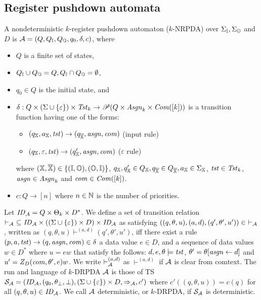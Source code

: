 \subsection{Register pushdown automata}\label{sec:RA}
\begin{definition}
A nondeterministic $k$-register pushdown automaton ($k$-NRPDA) over $\Sigma_{\mathbb{I}},\Sigma_{\mathbb{O}}$ and $D$ is ${\cal A}=(Q, Q_{\mathbb{I}}, Q_{\mathbb{O}}, q_0, \delta, c)$, where
\begin{itemize}
\item $Q$ is a finite set of states,
\item $Q_{\mathbb{I}}\cup Q_{\mathbb{O}} = Q, Q_{\mathbb{I}}\cap Q_{\mathbb{O}} = \emptyset$,
\item $q_0\in Q$ is the initial state, and
\item $\delta: Q \times (\Sigma\cup\{\varepsilon\})\times \mathit{Tst}_k \to \mathscr{P}(Q \times\mathit{Asgn}_k\times \mathit{Com}([k]))$ is a transition function having one of the forms:
\begin{itemize}
\item $(q_{\mathbb{X}},a_{\mathbb{X}},\mathit{tst})\to(q_{\overline{{\mathbb{X}}}},\mathit{asgn},\mathit{com})$ (input rule)
\item $(q_{\mathbb{X}},\varepsilon,\mathit{tst})\to(q'_{\mathbb{X}},\mathit{asgn},\mathit{com})$ ($\varepsilon$ rule)
\end{itemize}
where $({\mathbb{X}}, {\overline{{\mathbb{X}}}})\in\{({\mathbb{I}}, {\mathbb{O}}), ({\mathbb{O}},{\mathbb{I}})\}$,
$q_{\mathbb{X}}, q'_{\mathbb{X}}\in Q_{\mathbb{X}}, q_{\overline{{\mathbb{X}}}}\in Q_{\overline{{\mathbb{X}}}}, a_{\mathbb{X}}\in \Sigma_{\mathbb{X}}$, $\mathit{tst}\in\mathit{Tst}_k$, $\mathit{asgn}\in\mathit{Asgn}_k$ and $\mathit{com}\in\mathit{Com}([k])$.
\item $c: Q \to [n]$ where $n\in \mathbb{N}$ is the number of priorities.
\end{itemize}
\end{definition}
\noindent
Let $\mathit{ID}_{\cal A}= Q\times \Theta_k\times D^*$.
We define a set of transition relation $\vdash_{\cal A}\ \subseteq\mathit{ID}_{\cal A}\times ((\Sigma\cup\{\varepsilon\})\times D)\times \mathit{ID}_{\cal A}$ as satisfying
$((q,\theta,u), (a,d), (q',\theta',u'))\in\ \vdash_{\cal A}$,
written as $(q,\theta,u)\vdash^{(a,d)}(q',\theta',u')$, iff
there exist a rule $(p, a, \mathit{tst}) \to (q, \mathit{asgn}, \mathit{com}) \in \delta$
a data value $e\in D$, and a sequence of data values $w\in D^*$ where $u=ew$ that satisfy the follows:
$d, e, \theta\models\mathit{tst}$, $\theta' = \theta[\mathit{asgn}\leftarrow d]$ and $u'= Z_D(\mathit{com},\theta',e)w$.
We write $\vdash^{(a,d)}_{\cal A}$ as $\vdash^{(a,d)}$ if ${\cal A}$ is clear from comtext.
The run and language of $k$-DRPDA ${\cal A}$ is those of TS
${\cal S}_{\cal A}=(\mathit{ID}_{\cal A}, (q_0, \theta_\bot, \bot), (\Sigma\cup\{\varepsilon\})\times D, \Rightarrow_{\cal A}, c')$ where
$c'((q,\theta,u))=c(q)$ for all $(q,\theta,u)\in\mathit{ID}_{\cal A}$.
We call ${\cal A}$ deterministic, or $k$-DRPDA, if ${\cal S}_{\cal A}$ is deterministic.

